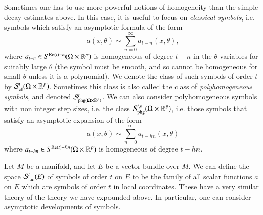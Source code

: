 \begin{example}
\end{example}

Sometimes one has to use more powerful notions of homogeneity than the simple decay estimates above. In this case, it is useful to focus on \emph{classical symbols}, i.e. symbols which satisfy an asymptotic formula of the form
%
\[ a(x,\theta) \sim \sum_{n = 0}^\infty a_{t-n}(x,\theta), \]
%
where $a_{t-n} \in S^{\text{Re}(t) - n}(\Omega \times \operatorname{\mathbb{R}}^p)$ is homogeneous of degree $t-n$ in the $\theta$ variables for suitably large $\theta$ (the symbol must be smooth, and so cannot be homogeneous for small $\theta$ unless it is a polynomial). We denote the class of such symbols of order $t$ by $\mathcal{S}^t_{\text{cl}}(\Omega \times \operatorname{\mathbb{R}}^p)$. Sometimes this class is also called the class of \emph{polyhomogeneous symbols}, and denoted $\mathcal{S}^t_{\text{phg}(\Omega \times \operatorname{\mathbb{R}}^p)}$. We can also consider polyhomogeneous symbols with non integer step sizes, i.e. the class $\mathcal{S}^{t,h}_{\text{phg}}(\Omega \times \operatorname{\mathbb{R}}^p)$, i.e. those symbols that satisfy an asymptotic expansion of the form
%
\[ a(x,\theta) \sim \sum_{n = 0}^\infty a_{t - hn}(x,\theta) \]
%
where $a_{t-hn} \in S^{\text{Re}(t) - hn}(\Omega \times \operatorname{\mathbb{R}}^p)$ is homogeneous of degree $t-hn$.

\begin{remark}
    Let $M$ be a manifold, and let $E$ be a vector bundle over $M$. We can define the space $\mathcal{S}^t_{\text{loc}}(E)$ of symbols of order $t$ on $E$ to be the family of all scalar functions $a$ on $E$ which are symbols of order $t$ in local coordinates. These have a very similar theory of the theory we have expounded above. In particular, one can consider asymptotic developments of symbols.
\end{remark}












